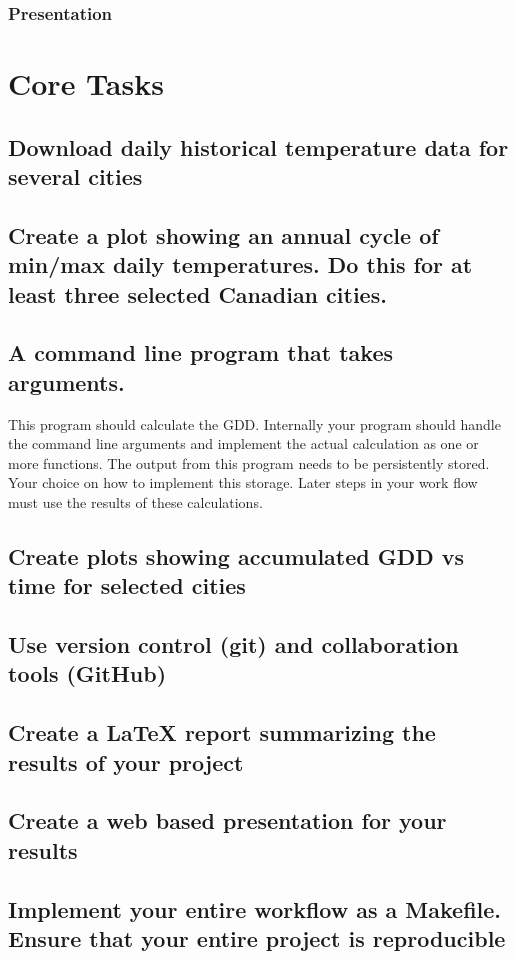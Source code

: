\documentclass{article}
\begin{document}
\subsubsection{Presentation}

\section{ \bf Core Tasks}
\subsection{Download daily historical temperature data for several cities}
\subsection{Create a plot showing an annual cycle of min/max daily temperatures. Do this for at least three selected Canadian cities.}
\subsection{A command line program that takes arguments.}
This program should calculate the GDD. Internally your program should handle the command line arguments and implement the actual calculation as one or more functions. The output from this program needs to be persistently stored. Your choice on how to implement this storage. Later steps in your work flow must use the results of these calculations.
\subsection{Create plots showing accumulated GDD vs time for selected cities}

\subsection{Use version control (git) and collaboration tools (GitHub)}
\subsection{Create a LaTeX report summarizing the results of your project}
\subsection{Create a web based presentation for your results}
\subsection{Implement your entire workflow as a Makefile. Ensure that your entire project is reproducible}
\end{document}
